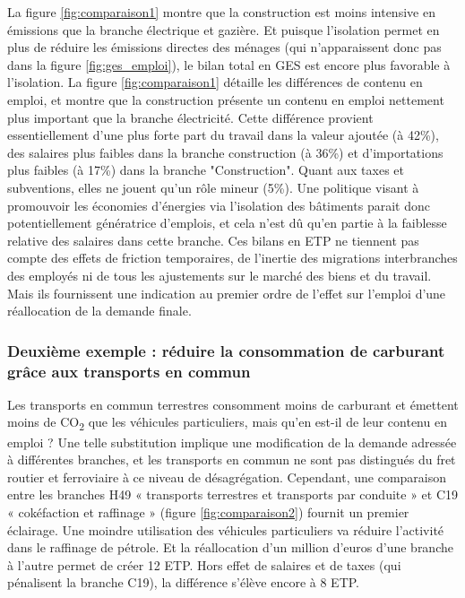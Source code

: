 La figure \ref{fig:comparaison1} montre que la construction est moins intensive en émissions que la branche électrique et gazière. Et puisque l’isolation permet en plus de réduire les émissions directes des ménages (qui n’apparaissent donc pas dans la figure \ref{fig:ges_emploi}), le bilan total en GES est encore plus favorable à l’isolation. 
La figure \ref{fig:comparaison1} détaille les différences de contenu en emploi, et montre que la construction présente un contenu en emploi nettement plus important que la branche électricité. 
Cette différence provient essentiellement d'une plus forte part du travail dans la valeur ajoutée (à 42\%), des salaires plus faibles dans la branche construction (à 36\%) et d'importations plus faibles (à 17\%) dans la branche "Construction". Quant aux taxes et subventions, elles ne jouent qu’un rôle mineur (5\%). 
Une politique visant à promouvoir les économies d’énergies via l’isolation des bâtiments parait donc potentiellement génératrice d’emplois, et cela n’est dû qu’en partie à la faiblesse relative des salaires dans cette branche. 
Ces bilans en ETP ne tiennent pas compte des effets de friction temporaires, de l’inertie des migrations interbranches des employés \citep{Duhautois2005} ni de tous les ajustements sur le marché des biens et du travail. Mais ils fournissent une indication au premier ordre de l’effet sur l’emploi d’une réallocation de la demande finale.

\subsubsection{Deuxième exemple : réduire la consommation de carburant grâce aux  transports en commun}

Les transports en commun terrestres consomment moins de carburant et émettent moins de CO\textsubscript{2} que les véhicules particuliers, mais qu’en est-il de leur contenu en emploi ? Une telle substitution implique une modification de la demande adressée à différentes branches, et les transports en commun ne sont pas distingués du fret routier et ferroviaire à ce niveau de désagrégation. 
Cependant, une comparaison entre les branches H49 « transports terrestres et transports par conduite » et C19 « cokéfaction et raffinage » (figure \ref{fig:comparaison2}) fournit un premier éclairage. Une moindre utilisation des véhicules particuliers va réduire l’activité dans le raffinage de pétrole. Et la réallocation d’un million d’euros d’une branche à l’autre permet de créer 12 ETP. Hors effet de salaires et de taxes (qui pénalisent la branche C19), la différence s’élève encore à 8 ETP.

